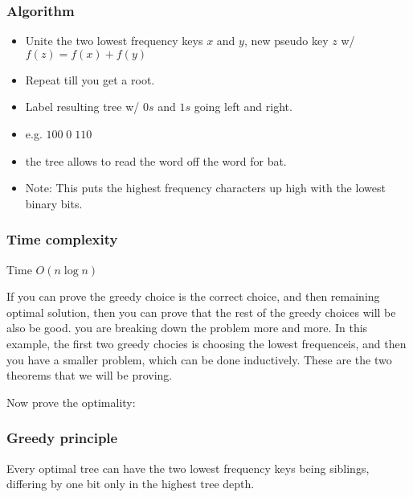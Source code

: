 \subsubsection{Algorithm}
\begin{process}
    \begin{itemize}
        \item Unite the two lowest frequency keys $x$ and $y$, new pseudo key $z$ w/ $f(z) = f(x) + f(y)$ 
        \item Repeat till you get a root. 
        \item Label resulting tree w/ $0s$ and $1s$ going left and right. 
    \end{itemize}

    \begin{itemize}
        \item e.g. $100 \; 0 \; 110$
        \item the tree allows to read the word off the word for bat. 
        \item Note: This puts the highest frequency characters up high with the lowest binary bits. 
    \end{itemize}

\end{process}

\subsubsection{Time complexity}
\begin{definition}
    Time $O(n \log n)$
\end{definition}

\begin{intuition}
    If you can prove the greedy choice is the correct choice, and then remaining optimal solution, then you can prove that the rest of the greedy choices will be also be good. you are breaking down the problem more and more. In this example, the first two greedy chocies is choosing the lowest frequenceis, and then you have a smaller problem, which can be done inductively. These are the two theorems that we will be proving. 
\end{intuition}

Now prove the optimality: 
\subsubsection{Greedy principle}
\begin{theorem}
Every optimal tree can have the two lowest frequency keys being siblings, differing by one bit only in the highest tree depth. 

\end{theorem}


